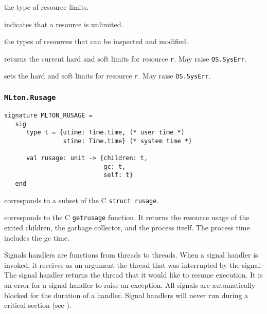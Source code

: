 \begin{description}
the type of resource limits.

indicates that a resource is unlimited.

the types of resources that can be inspected and modified.

returns the current hard and soft limits for resource {\tt r}. May
raise {\tt OS.SysErr}.

sets the hard and soft limits for resource {\tt r}.  May raise {\tt OS.SysErr}.
\end{description}
%
\subsubsection{\tt MLton.Rusage}

\begin{verbatim}
signature MLTON_RUSAGE =
   sig
      type t = {utime: Time.time, (* user time *)
                stime: Time.time} (* system time *)
         
      val rusage: unit -> {children: t,
                           gc: t,
                           self: t}
   end
\end{verbatim}

\begin{description}
corresponds to a subset of the C {\tt struct rusage}.

corresponds to the C {\tt getrusage} function.  It returns the resource usage of
the exited children, the garbage collector, and the process itself.  The process
time includes the gc time.
\end{description}

Signals handlers are functions from threads to threads.  When a signal 
handler is invoked, it receives as an argument the thread that was
interrupted by the signal.  The signal handler returns the thread that 
it would like to resume execution.  It is an error for a signal
handler to raise an exception.  All signals are automatically blocked
for the duration of a handler.  Signal handlers will never run during
a critical section (see ).

